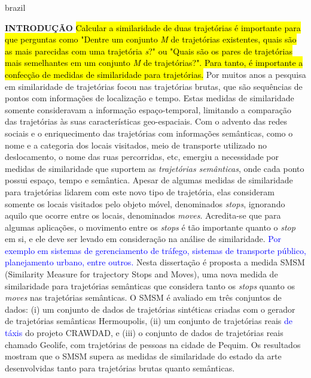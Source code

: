 {
    \begin{otherlanguage*}{brazil}
    \begin{resumo}
        \textbf{INTRODUÇÃO}
        \newline
        \newline
        \hl{Calcular a similaridade de duas trajetórias é importante para que perguntas como "Dentre um conjunto \emph{M} de trajetórias existentes, quais são as mais parecidas com uma trajetória \emph{s}?" ou "Quais são os pares de trajetórias mais semelhantes em um conjunto \emph{M} de trajetórias?". Para tanto, é importante a confecção de medidas de similaridade para trajetórias.} Por muitos anos a pesquisa em similaridade de trajetórias focou nas trajetórias brutas, que são sequências de pontos com informações de localização e tempo. Estas medidas de similaridade somente consideravam a informação espaço-temporal, limitando a comparação das trajetórias às suas características geo-espaciais. Com o advento das redes sociais e o enriquecimento das trajetórias com informações semânticas, como o nome e a categoria dos locais visitados, meio de transporte utilizado no deslocamento, o nome das ruas percorridas, etc, emergiu a necessidade por medidas de similaridade que suportem as \emph{trajetórias semânticas}, onde cada ponto possui espaço, tempo e semântica. Apesar de algumas medidas de similaridade para trajetórias lidarem com este novo tipo de trajetória, elas consideram somente os locais visitados pelo objeto móvel, denominados \emph{stops}, ignorando aquilo que ocorre entre os locais, denominados \emph{moves}.
        Acredita-se que para algumas aplicações, o movimento entre os \emph{stops} é tão importante quanto o \emph{stop} em si, e ele deve ser levado em consideração na análise de similaridade. \textcolor{blue}{Por exemplo em sistemas de gerenciamento de tráfego, sistemas de transporte público, planejamento urbano, entre outros.}
        Nesta dissertação é proposta a medida SMSM (Similarity Measure for trajectory Stops and Moves), uma nova medida de similaridade para trajetórias semânticas que considera tanto os \emph{stops} quanto os \emph{moves} nas trajetórias semânticas.
        O SMSM é avaliado em três conjuntos de dados: (i) um conjunto de dados de trajetórias sintéticas criadas com o gerador de trajetórias semânticas Hermoupolis, (ii) um conjunto de trajetórias reais \textcolor{blue}{de táxis} do projeto CRAWDAD, e (iii) o conjunto de dados de trajetórias reais chamado Geolife, com trajetórias de pessoas na cidade de Pequim. Os resultados mostram que o SMSM supera as medidas de similaridade do estado da arte desenvolvidas tanto para trajetórias brutas quanto semânticas.
        

\end{resumo}
\end{otherlanguage*}}
